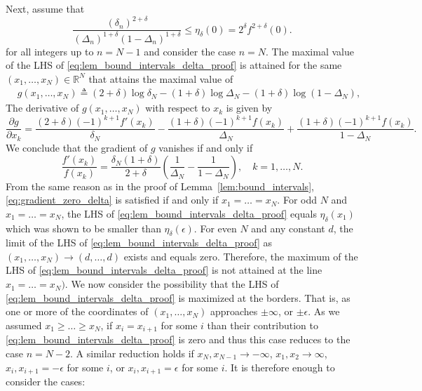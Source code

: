 \documentclass[letterpaper, 11pt]{IEEEtran}      %
\begin{document}
Next, assume that 
\begin{equation}
\frac{ \left( \delta_n \right)^{2+\delta}} 
{\left(\Delta_n \right)^{1+\delta}\left(1- \Delta_n \right)^{1+\delta} } \leq \eta_\delta(0) = 2^\delta f^{2+\delta}(0) . 
\label{eq:lem_bound_intervals_delta_proof}
\end{equation}
for all integers up to $n = N-1$ and consider the case $n = N$. 
%
The maximal value of the LHS of \eqref{eq:lem_bound_intervals_delta_proof} is attained for the same $(x_1,\ldots,x_N) \in \mathbb R^N$ that attains the maximal value of 
\begin{align*}
& g(x_1,\ldots, x_N) \triangleq  (2+\delta) \log \delta_N - (1+\delta) \log \Delta_N - (1+\delta) \log \left(1 - \Delta_N  \right),
\end{align*}
 The derivative of $g(x_1,\ldots,x_N)$ with respect to $x_k$ is given by
\[
\frac{\partial  g}{\partial x_k} = \frac{(2+\delta) (-1)^{k+1} f'(x_k)}{\delta_N} -\frac{(1+\delta)(-1)^{k+1} f(x_k)}{\Delta_N } + \frac{(1+\delta)(-1)^{k+1} f(x_k)}{1-\Delta_N }.
\]
We conclude that the gradient of $g$ vanishes if and only if
\begin{equation}
\label{eq:gradient_zero_delta}
\frac{f'(x_k)}{f(x_k)} = \frac{\delta_N(1+\delta)}{2+\delta} \left( \frac{1}{\Delta_N} - \frac{1}{1-\Delta_N} \right),\quad k=1,\ldots,N.
\end{equation}
From the same reason as in the proof of Lemma~\ref{lem:bound_intervals}, \eqref{eq:gradient_zero_delta} is satisfied if and only if $x_1 = \ldots = x_N$. For odd $N$ and $x_1=\ldots =x_N$, the LHS of \eqref{eq:lem_bound_intervals_delta_proof} equals $\eta_\delta(x_1)$ which was shown to be smaller than $\eta_\delta(\epsilon)$. For even $N$ and any constant $d$, the limit of the LHS of \eqref{eq:lem_bound_intervals_delta_proof} as $(x_1,\ldots,x_N)\rightarrow (d,\ldots,d)$ exists and equals zero. Therefore, the maximum of the LHS of \eqref{eq:lem_bound_intervals_delta_proof} is not attained at the line $x_1=\ldots=x_N)$. We now consider the possibility that the LHS of \eqref{eq:lem_bound_intervals_delta_proof} is maximized at the borders. That is, as one or more of the coordinates of $(x_1,\ldots,x_N)$ approaches $\pm \infty$,  or $\pm \epsilon$. As we assumed $x_1 \geq \ldots \geq x_N$, if $x_i = x_{i+1}$ for some $i$ than their contribution to \eqref{eq:lem_bound_intervals_delta_proof} is zero and thus this case reduces to the case $n= N-2$. A similar reduction holds if $x_N, x_{N-1} \to -\infty$, $x_1, x_2 \to \infty$,  $x_i, x_{i+1} = -\epsilon$ for some $i$, or $x_i, x_{i+1} = \epsilon$ for some $i$. It is therefore enough to consider the cases:
\end{document}
